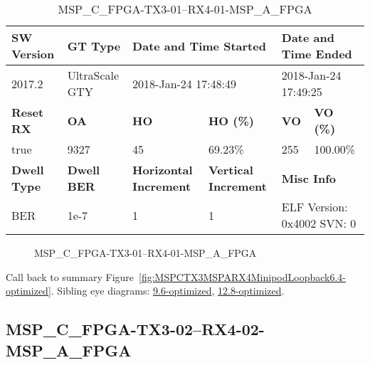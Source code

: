 \begin{table}[h]
\centering
\caption{MSP\_C\_FPGA-TX3-01--RX4-01-MSP\_A\_FPGA}
\label{tab:MSPCFPGATX301RX401MSPAFPGA6.4-optimized}
\begin{tabular}{@{}|l|l|l|l|l|l|@{}}
\toprule
\textbf{SW Version}                & \textbf{GT Type}   & \multicolumn{2}{l|}{\textbf{Date and Time Started}}            & \multicolumn{2}{l|}{\textbf{Date and Time Ended}}        \\ \midrule
2017.2                       & UltraScale GTY          & \multicolumn{2}{l|}{2018-Jan-24 17:48:49}                   & \multicolumn{2}{l|}{2018-Jan-24 17:49:25}               \\ \midrule
\textbf{Reset RX}                  & \textbf{OA} & \textbf{HO}   & \textbf{HO (\%)} & \textbf{VO} & \textbf{VO (\%)} \\ \midrule
true & 9327        & 45          & 69.23\%        & 255        & 100.00\%       \\ \midrule
\textbf{Dwell Type}                & \textbf{Dwell BER} & \textbf{Horizontal Increment} & \textbf{Vertical Increment}    & \multicolumn{2}{l|}{\textbf{Misc Info}}                  \\ \midrule
BER                            & 1e-7        & 1        & 1           & \multicolumn{2}{l|}{ELF Version: 0x4002 SVN: 0}                         \\ \bottomrule
\end{tabular}
\end{table}

\begin{figure}[h]
\caption{MSP\_C\_FPGA-TX3-01--RX4-01-MSP\_A\_FPGA} \label{fig:MSPCFPGATX301RX401MSPAFPGA6.4-optimized}
\end{figure}

Call back to summary Figure~\ref{fig:MSPCTX3MSPARX4MinipodLoopback6.4-optimized}.
Sibling eye diagrams: \hyperref[sec:MSPCFPGATX301RX401MSPAFPGA9.6-optimized]{9.6-optimized}, \hyperref[sec:MSPCFPGATX301RX401MSPAFPGA12.8-optimized]{12.8-optimized}.

\clearpage
\newpage


\subsection{MSP\_C\_FPGA-TX3-02--RX4-02-MSP\_A\_FPGA}\label{sec:MSPCFPGATX302RX402MSPAFPGA6.4-optimized}

